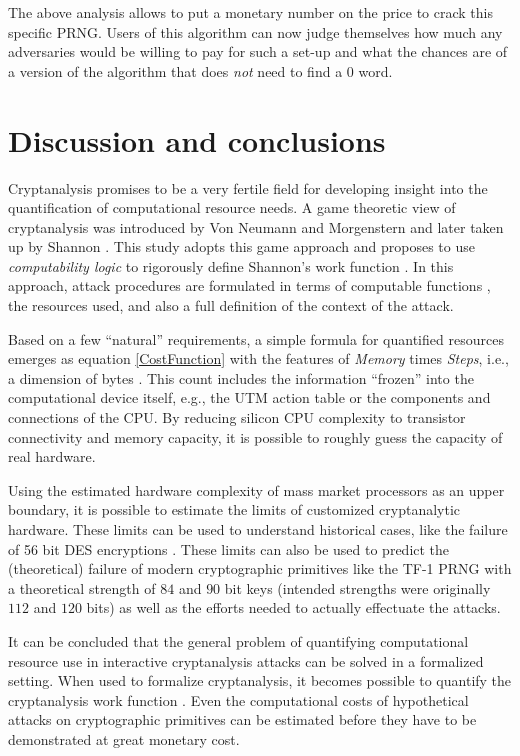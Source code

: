 \documentclass{article}
\begin{document}
The above analysis
allows to put a monetary number on the price to crack this specific PRNG. Users
of this algorithm can now judge themselves how much any adversaries would be
willing to pay for such a set-up and what the chances are of a version of the
algorithm that does \textit{not} need to find a $0$ word.

\section{Discussion and conclusions}\label{SectDiscussion}

Cryptanalysis promises to be a very fertile field for
developing insight into the quantification of computational resource needs.
A game theoretic view of cryptanalysis was introduced by Von Neumann and 
Morgenstern and later taken up by Shannon \cite{NeumanMorgenstern1947,Shannon1949}.
This study adopts this game approach and proposes to use \textit{computability logic}
\cite{japaridze2005,GiorgiJaparidze08012006,Son0911-5262} to rigorously define
Shannon's work function  \cite{Shannon1949}. In this approach, attack procedures are 
formulated in terms of computable functions \cite{Turing1936CNA}, the resources used, 
and also a full definition of the context of the attack.

Based on a few ``natural'' requirements, a simple formula for quantified
resources emerges as equation \ref{CostFunction} with the features of 
\textit{Memory} times \textit{Steps}, i.e., a dimension of bytes 
\cite{Son0911-5262}. This count includes the information
``frozen'' into the computational device itself, e.g., the UTM action table or the
components and connections of the CPU. By reducing silicon CPU complexity to
transistor connectivity and memory capacity, it is possible to roughly guess the
capacity of real hardware. 

Using the estimated hardware complexity of mass market processors as an
upper boundary, it is possible to estimate the limits of customized cryptanalytic
hardware. These limits can be used to understand historical cases, like the failure
of 56 bit DES encryptions \cite{DEScracker:1998}. 
These limits can also be used to predict the (theoretical) failure of modern
cryptographic primitives like the TF-1 PRNG with a theoretical strength
of $84$ and $90$ bit keys (intended strengths were originally $112$ and 
$120$ bits) \cite{KlimovShamir04,tsaban:0507063} as well as the efforts 
needed to actually effectuate the attacks.

It can be concluded that the general problem of quantifying computational 
resource use in interactive cryptanalysis attacks can be solved in a 
formalized setting. When used to formalize cryptanalysis, it becomes possible 
to quantify the cryptanalysis work function \cite{Shannon1949}. Even the 
computational costs of hypothetical attacks on cryptographic primitives can 
be estimated before they have to be demonstrated at great monetary cost. 
\end{document}
